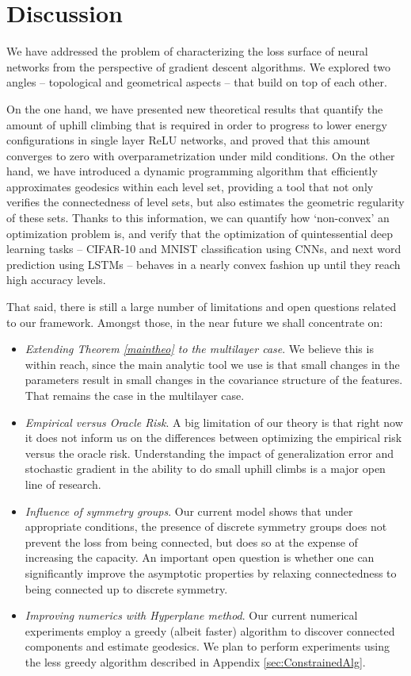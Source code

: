 \section{Discussion}
\label{sec:Discussion}

We have addressed the problem of characterizing the loss surface of neural networks from the perspective
of gradient descent algorithms. We explored two angles -- topological and geometrical aspects -- that build on top of each other. 


On the one hand, we have presented new theoretical results that quantify 
the amount of uphill climbing that is required in order to progress to lower energy configurations in 
single layer ReLU networks, and proved that this amount converges to zero with overparametrization under mild conditions. On the other hand, we have introduced a dynamic programming algorithm that efficiently approximates geodesics within each level set, providing a tool that not only verifies the connectedness of level sets, but also estimates the geometric regularity of these sets. Thanks to this information, we can quantify how `non-convex' an optimization problem is, and verify that the optimization of quintessential deep learning tasks -- CIFAR-10 and MNIST classification using CNNs, and next word prediction using LSTMs -- behaves in a nearly convex fashion up until they reach high accuracy levels.

That said, there is still a large number of limitations and open questions related to our framework. Amongst those, in the near future we shall concentrate on:
\begin{itemize}
\item \emph{Extending Theorem \ref{maintheo} to the multilayer case}. We believe this is within reach, since the main analytic tool we use is that small changes in the parameters result in small changes in the covariance structure of the features. That remains the case in the multilayer case. 
\item \emph{Empirical versus Oracle Risk}. A big limitation of our theory is that right now it does not inform us on the differences between optimizing the empirical risk versus the oracle risk. Understanding the impact of generalization error and stochastic gradient in the ability to do small uphill climbs is a major open line of research.
\item \emph{Influence of symmetry groups}. Our current model shows that under appropriate conditions, the presence of discrete symmetry groups does not prevent the loss from being connected, but does so at the expense of increasing the capacity. An important open question is whether one can significantly improve the asymptotic properties by relaxing connectedness to being connected up to discrete symmetry. 
\item \emph{Improving numerics with Hyperplane method}. Our current numerical experiments employ a greedy (albeit faster) algorithm to discover connected components and estimate geodesics. We plan to perform experiments using the less greedy algorithm described in Appendix \ref{sec:ConstrainedAlg}. 
\end{itemize}
 

%
